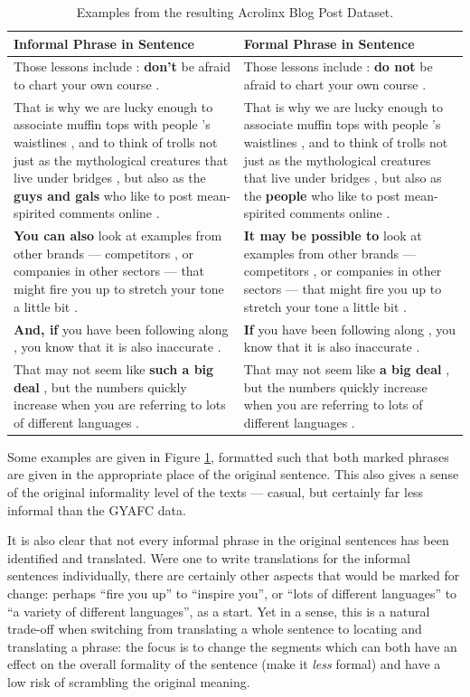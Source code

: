 \begin{table}[h]
\centering
 \begin{tabular}{|| p{6cm} | p{6cm} ||} 
 \hline
 Informal Phrase in Sentence & Formal Phrase in Sentence \\ [0.3ex] 
 \hline\hline
 Those lessons include : \textbf{don't} be afraid to chart your own course . & 
    Those lessons include : \textbf{do not} be afraid to chart your own course . \\
\hline
 That is why we are lucky enough to associate muffin tops with people 's waistlines , and to think of trolls not just as the mythological creatures that live under bridges , but also as the \textbf{guys and gals} who like to post mean-spirited comments online . & 
    That is why we are lucky enough to associate muffin tops with people 's waistlines , and to think of trolls not just as the mythological creatures that live under bridges , but also as the \textbf{people} who like to post mean-spirited comments online . \\
\hline
 \textbf{You can also} look at examples from other brands — competitors , or companies in other sectors — that might fire you up to stretch your tone a little bit . & 
    \textbf{It may be possible to} look at examples from other brands — competitors , or companies in other sectors — that might fire you up to stretch your tone a little bit . \\
\hline
 \textbf{And, if} you have been following along , you know that it is also inaccurate . & 
    \textbf{If} you have been following along , you know that it is also inaccurate . \\
\hline
 That may not seem like \textbf{such a big deal} , but the numbers quickly increase when you are referring to lots of different languages . & 
    That may not seem like \textbf{a big deal} , but the numbers quickly increase when you are referring to lots of different languages . \\
\hline
\end{tabular}
\caption{Examples from the resulting Acrolinx Blog Post Dataset.}
\label{acro-data-examples}
\end{table}

Some examples are given in Figure \ref{acro-data-examples}, formatted such that both marked phrases are given in the appropriate place of the original sentence. This also gives a sense of the original informality level of the texts --- casual, but certainly far less informal than the GYAFC data.

It is also clear that not every informal phrase in the original sentences has been identified and translated. Were one to write translations for the informal sentences individually, there are certainly other aspects that would be marked for change: perhaps ``fire you up'' to ``inspire you'', or ``lots of different languages'' to ``a variety of different languages'', as a start. Yet in a sense, this is a natural trade-off when switching from translating a whole sentence to locating and translating a phrase: the focus is to change the segments which can both have an effect on the overall formality of the sentence (make it \textit{less} formal) and have a low risk of scrambling the original meaning.


